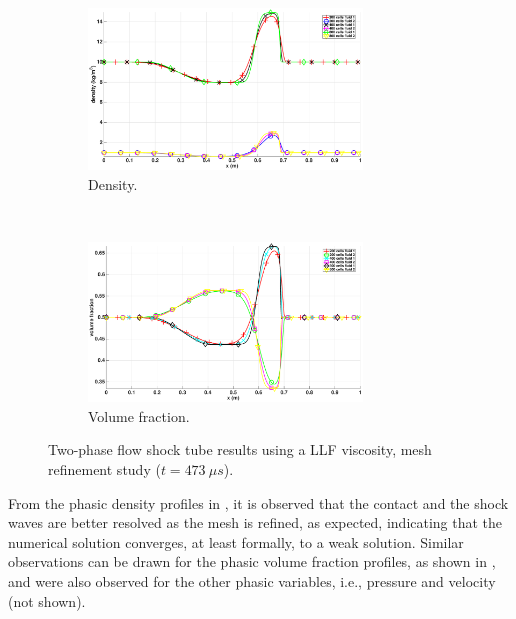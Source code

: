 \begin{figure}[!htbp]
        \centering
        \begin{subfigure}[b]{0.95\textwidth}
                \centering
                \includegraphics[width=0.8\textwidth]{figures/relaxation_two_phases_density_multi_mesh.eps}
                \caption{Density.}
                \label{fig:density-mult-meshes}
        \end{subfigure}
				\\
        \begin{subfigure}[b]{0.95\textwidth}
                \centering
                \includegraphics[width=0.8\textwidth]{figures/relaxation_two_phases_volume_fraction_multi_mesh.eps}
                \caption{Volume fraction.}
                \label{fig:vf-mult-meshes}
        \end{subfigure}
        \caption{Two-phase flow shock tube results using a LLF viscosity, mesh refinement study ($t=473 \ \mu s$).}
				\label{fig:density-vf-mult-mesh}
\end{figure}
%
From the phasic density profiles in , it is observed that the contact and the shock waves are better resolved as the mesh is refined, as expected, indicating that the numerical solution converges, at least formally, to a weak solution. Similar observations can be drawn for the phasic volume fraction profiles, as shown in , and were also observed for the other phasic variables, i.e., pressure and velocity (not shown).
%
\clearpage
\newpage
